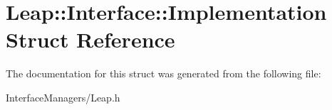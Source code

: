 \hypertarget{struct_leap_1_1_interface_1_1_implementation}{\section{Leap\+:\+:Interface\+:\+:Implementation Struct Reference}
\label{struct_leap_1_1_interface_1_1_implementation}
}


The documentation for this struct was generated from the following file\+:\begin{DoxyCompactItemize}
\item 
Interface\+Managers/Leap.\+h\end{DoxyCompactItemize}
